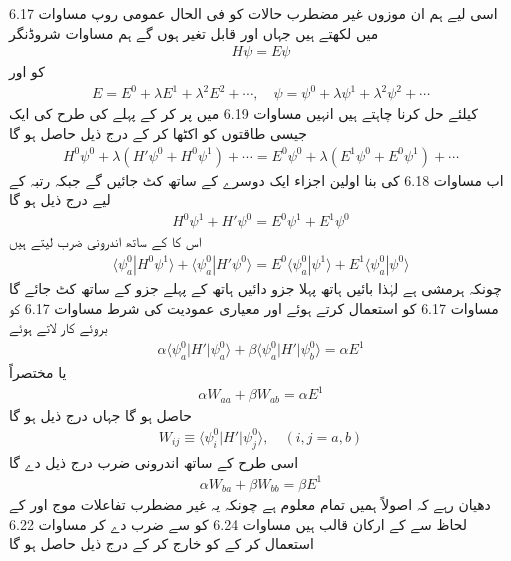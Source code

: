 اسی لیے ہم ان موزوں غیر مضطرب حالات کو فی الحال عمومی روپ مساوات 6.17 میں لکھتے ہیں جہاں  اور  قابل تغیر ہوں گے ہم مساوات شروڈنگر
\begin{align}
H \psi = E \psi
\end{align}
کو  اور 
\begin{align}
E = E^0 + \lambda E^1 + \lambda^2 E^2 + \cdots, \quad \psi = \psi^0 + \lambda \psi^1 + \lambda^2 \psi^2 + \cdots
\end{align}
کیلئے حل کرنا چاہتے ہیں انہیں مساوات 6.19 میں پر کر کے پہلے کی طرح  کی ایک جیسی طاقتوں کو اکٹھا کر کے درج ذیل حاصل ہو گا 
\begin{align*}
H^0 \psi^0 + \lambda (H' \psi^0 + H^0 \psi^1) + \cdots = E^0 \psi^0 + \lambda (E^1 \psi^0 + E^0 \psi^1) + \cdots
\end{align*}
اب  مساوات 6.18 کی بنا اولین اجزاء ایک دوسرے کے ساتھ کٹ جائیں گے جبکہ  رتبہ کے لیے درج ذیل ہو گا 
\begin{align}
H^0 \psi^1 + H' \psi^0 = E^0 \psi^1 + E^1 \psi^0
\end{align}
اس کا  کے ساتھ اندرونی ضرب لیتے ہیں 
\begin{align*} 
\langle \psi_a^0 | H^0 \psi^1 \rangle + \langle \psi_a^0 | H' \psi^0 \rangle = E^0 \langle \psi_a^0 | \psi^1 \rangle + E^1 \langle \psi_a^0 | \psi^0 \rangle
\end{align*}
چونکہ  ہرمشی ہے لہٰذا  بائیں ہاتھ پہلا جزو دائیں ہاتھ کے پہلے جزو کے ساتھ کٹ جائے گا مساوات 6.17 کو استعمال کرتے ہوئے اور معیاری عمودیت کی شرط مساوات 6.17 کو بروئے کار لاتے ہوئے 
\begin{align*}
\alpha \langle \psi_a^0 | H' | \psi_a^0 \rangle + \beta \langle \psi_a^0 | H' | \psi_b^0 \rangle = \alpha E^1
\end{align*}
یا مختصراً
\begin{align}
\alpha W_{aa} + \beta W_{ab} = \alpha E^1
\end{align}
حاصل ہو گا جہاں درج ذیل ہو گا 
\begin{align}
W_{ij} \equiv \langle \psi_i^0 | H' | \psi_j^0 \rangle, \quad (i, j = a, b)
\end{align}
اسی طرح  کے ساتھ اندرونی ضرب درج ذیل دے گا 
\begin{align}
\alpha W_{ba} + \beta W_{bb} = \beta E^1
\end{align}
دھیان رہے کہ اصولاً ہمیں تمام  معلوم ہے چونکہ یہ غیر مضطرب تفاعلات موج  اور  کے لحاظ سے  کے ارکان قالب ہیں مساوات 6.24 کو  سے ضرب دے کر مساوات 6.22 استعمال کر کے  کو خارج کر کے درج ذیل حاصل ہو گا 
